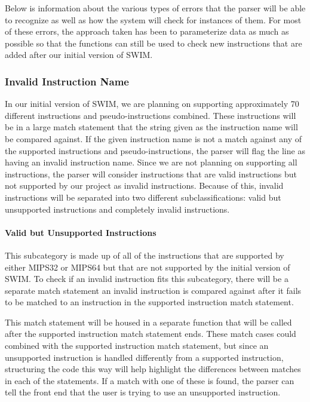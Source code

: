 \documentclass[
    paper=letter,
    parskip=half,
    fontsize=12pt,
    titlepage=firstiscover,
    toc=bibliography,
    numbers=endperiod
]{scrartcl}
\begin{document}
Below is information about the various types of errors that the parser
will be able to recognize as well as how the system will check for
instances of them. For most of these errors, the approach taken has been
to parameterize data as much as possible so that the functions can still
be used to check new instructions that are added after our initial
version of SWIM.

\subsubsection{Invalid Instruction Name}

In our initial version of SWIM, we are planning on supporting
approximately 70 different instructions and pseudo-instructions
combined. These instructions will be in a large match statement that the
string given as the instruction name will be compared against. If the
given instruction name is not a match against any of the supported
instructions and pseudo-instructions, the parser will flag the line as
having an invalid instruction name. Since we are not planning on
supporting all instructions, the parser will consider instructions that
are valid instructions but not supported by our project as invalid
instructions. Because of this, invalid instructions will be separated
into two different subclassifications: valid but unsupported
instructions and completely invalid instructions.

\paragraph{Valid but Unsupported Instructions}

This subcategory is made up of all of the instructions that are
supported by either MIPS32 or MIPS64 but that are not supported by the
initial version of SWIM. To check if an invalid instruction fits this
subcategory, there will be a separate match statement an invalid
instruction is compared against after it fails to be matched to an
instruction in the supported instruction match statement.

This match statement will be housed in a separate function that will be
called after the supported instruction match statement ends. These match
cases could combined with the supported instruction match statement, but
since an unsupported instruction is handled differently from a supported
instruction, structuring the code this way will help highlight the
differences between matches in each of the statements. If a match with
one of these is found, the parser can tell the front end that the user
is trying to use an unsupported instruction.
\end{document}
